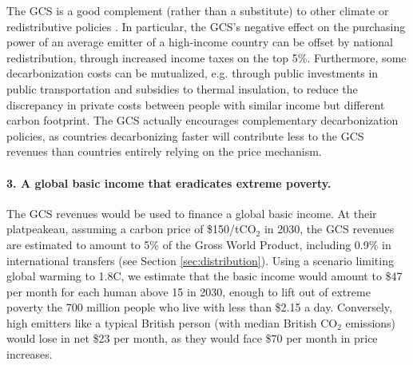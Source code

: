 \documentclass[12pt,english]{article}
\begin{document}
The GCS is a good complement (rather than a substitute) to other climate or redistributive policies \citep{stiglitz_addressing_2019}. In particular, the GCS's negative effect on the purchasing power of an average emitter of a high-income country can be offset by national redistribution, through increased income taxes on the top 5\%. Furthermore, some decarbonization costs can be mutualized, e.g. through public investments in public transportation and subsidies to thermal insulation, to reduce the discrepancy in private costs between people with similar income but different carbon footprint. The GCS actually encourages complementary decarbonization policies, as countries decarbonizing faster will contribute less to the GCS revenues than countries entirely relying on the price mechanism. %

\paragraph*{3. A global basic income that eradicates extreme poverty.}

The GCS revenues would be used to finance a global basic income. At their platpeakeau, assuming a carbon price of \$150/tCO$_\text{2}$ in 2030, the GCS revenues are estimated to amount to 5\% of the Gross World Product, including 0.9\% in international transfers (see Section \ref{sec:distribution}). %
Using a scenario limiting global warming to 1.8\textdegree{}C,%
we estimate that the basic income would amount to \$47 per month for each human above 15 in 2030, enough to lift out of extreme poverty the 700 million people who live with less than \$2.15 a day. Conversely, high emitters like a typical British person (with median British CO$_\text{2}$ emissions) would lose in net \$23 per month, as they would face \$70 per month in price increases. %
\end{document}
